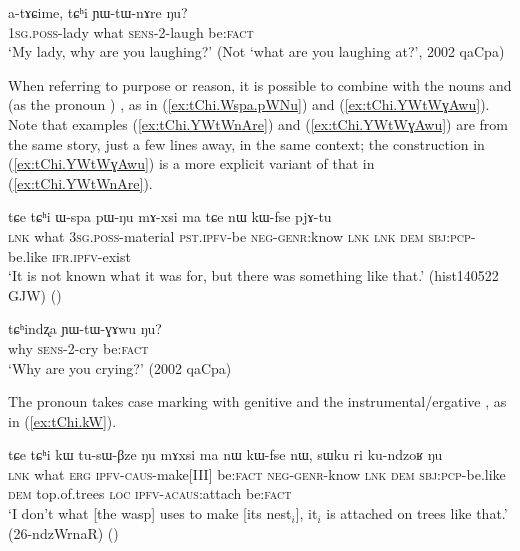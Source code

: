 \begin{exe}
\ex \label{ex:tChi.YWtWnAre}
\gll  a-tɤɕime, tɕʰi ɲɯ-tɯ-nɤre ŋu? \\
 \textsc{1sg}.\textsc{poss}-lady what \textsc{sens}-2-laugh be:\textsc{fact} \\
 \glt `My lady, why are you laughing?'  (Not `what are you laughing at?', 2002 qaCpa)
\end{exe}  

When referring to purpose or reason, it is possible to combine   with the nouns  and  (as the pronoun ) , as in (\ref{ex:tChi.Wspa.pWNu}) and (\ref{ex:tChi.YWtWɣAwu}). Note that examples (\ref{ex:tChi.YWtWnAre}) and (\ref{ex:tChi.YWtWɣAwu}) are from the same story, just a few lines away, in the same context; the construction in (\ref{ex:tChi.YWtWɣAwu}) is a more explicit variant of that in (\ref{ex:tChi.YWtWnAre}).

\begin{exe}
\ex \label{ex:tChi.Wspa.pWNu}
\gll tɕe tɕʰi ɯ-spa pɯ-ŋu mɤ-xsi ma tɕe nɯ kɯ-fse pjɤ-tu  \\
\textsc{lnk} what \textsc{3sg}.\textsc{poss}-material \textsc{pst}.\textsc{ipfv}-be \textsc{neg}-\textsc{genr}:know \textsc{lnk} \textsc{lnk} \textsc{dem} \textsc{sbj}:\textsc{pcp}-be.like \textsc{ifr}.\textsc{ipfv}-exist \\
\glt `It is not known what it was for, but there was something like that.' (hist140522 GJW)
()
\end{exe}  

\begin{exe}
\ex \label{ex:tChi.YWtWɣAwu}
\gll tɕʰindʐa ɲɯ-tɯ-ɣɤwu ŋu? \\
why \textsc{sens}-2-cry be:\textsc{fact} \\
\glt `Why are you crying?' (2002 qaCpa)
\end{exe} 

The pronoun  takes case marking with genitive  and the instrumental/ergative , as in (\ref{ex:tChi.kW}).

\begin{exe}
\ex \label{ex:tChi.kW}
\gll tɕe tɕʰi kɯ tu-sɯ-βze ŋu mɤxsi ma nɯ kɯ-fse nɯ, sɯku ri ku-ndzoʁ ŋu \\
\textsc{lnk} what \textsc{erg} \textsc{ipfv}-\textsc{caus}-make[III] be:\textsc{fact} \textsc{neg}-\textsc{genr}-know \textsc{lnk} \textsc{dem} \textsc{sbj}:\textsc{pcp}-be.like \textsc{dem} top.of.trees \textsc{loc} \textsc{ipfv}-\textsc{acaus}:attach be:\textsc{fact} \\
\glt `I don't what [the wasp] uses to make [its nest$_i$], it$_i$ is attached on trees like that.' (26-ndzWrnaR) ()
\end{exe} 

